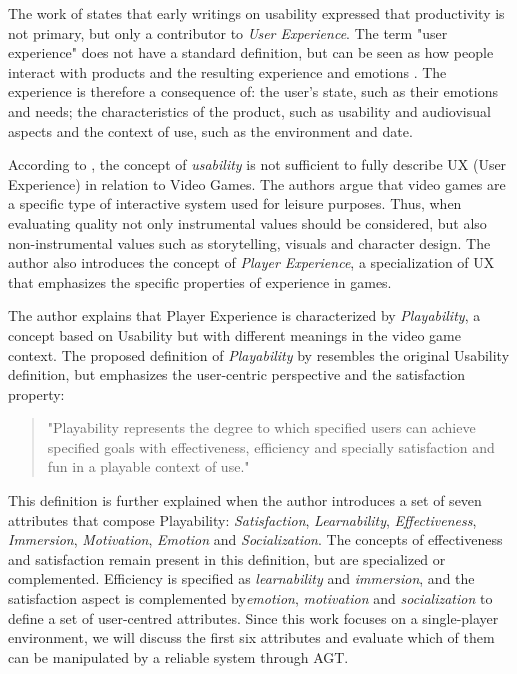 \documentclass[cic,tc,english]{iiufrgs}
\begin{document}
The work of \citep{ARTICLE_UserExperienceAResearchAgenda} states that early writings on usability expressed that productivity is not primary, but only a contributor to \emph{User Experience}. The term "user experience" does not have a standard definition, but can be seen as how people interact with products and the resulting experience and emotions \cite{ARTICLE_UnderstandingExperience}. The experience is therefore a consequence of: the user's state, such as their emotions and needs; the characteristics of the product, such as usability and audiovisual aspects and the context of use, such as the environment and date.

According to \cite{ARTICLE_FromUsabilityToPlayability}, the concept of \emph{usability} is not sufficient to fully describe UX (User Experience) in relation to Video Games. The authors argue that video games are a specific type of interactive system used for leisure purposes. Thus, when evaluating quality not only instrumental values should be considered, but also non-instrumental values such as storytelling, visuals and character design. The author also introduces the concept of \emph{Player Experience}, a specialization of UX that emphasizes the specific properties of experience in games.

The author explains that Player Experience is characterized by \emph{Playability}, a concept based on Usability but with different meanings in the video game context. The proposed definition of \emph{Playability} by \cite{ARTICLE_FromUsabilityToPlayability} resembles the original Usability definition, but emphasizes the user-centric perspective and the satisfaction property:

\begin{quotation}
"Playability represents the degree to which specified users can achieve specified goals with effectiveness, efficiency and specially satisfaction and fun in a playable context of use."
\end{quotation}

This definition is further explained when the author introduces a set of seven attributes that compose Playability: \emph{Satisfaction}, \emph{Learnability}, \emph{Effectiveness}, \emph{Immersion}, \emph{Motivation}, \emph{Emotion} and \emph{Socialization}. The concepts of effectiveness and satisfaction remain present in this definition, but are specialized or complemented. Efficiency is specified as \emph{learnability} and \emph{immersion}, and the satisfaction aspect is complemented by\emph{emotion}, \emph{motivation} and \emph{socialization} to define a set of user-centred attributes. Since this work focuses on a single-player environment, we will discuss the first six attributes and evaluate which of them can be manipulated by a reliable system through AGT.
\end{document}
